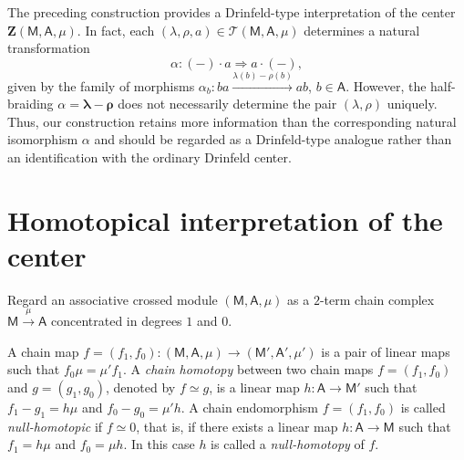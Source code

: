 \documentclass[12pt,reqno]{amsart}
\theoremstyle{plain}
\theoremstyle{definition}
\theoremstyle{remark}
\newcommand{\A}{\ensuremath{\mathsf{A}}}
\newcommand{\MM}{\ensuremath{\mathsf{M}}}
\newcommand{\ZC}{\ensuremath{\mathbf{Z}}}
\newcommand{\T}{\ensuremath{\mathcal{T}}}
\numberwithin{equation}{section}
\begin{document}
The preceding construction provides a Drinfeld-type interpretation of the center $\ZC(\MM,\A,\mu)$. In fact, each $(\lambda,\rho,a)\in\T(\MM,\A,\mu)$ determines a natural transformation 
\[\alpha\colon (-)\cdot a \Longrightarrow a\cdot (-),\]
given by the family of morphisms $\alpha_{b}\colon ba\xrightarrow{\lambda(b)-\rho(b)}ab$, $b\in \A$. However, the half-braiding $\alpha=\boldsymbol{\lambda}-\boldsymbol{\rho}$ does not necessarily determine the pair $(\lambda,\rho)$ uniquely. Thus, our construction retains more information than the corresponding natural isomorphism $\alpha$ and should be regarded as a Drinfeld-type analogue rather than an identification with the ordinary Drinfeld center.


\section{Homotopical interpretation of the center} \label{S:homoto}


Regard an associative crossed module $(\MM,\A,\mu)$ as a $2$-term chain complex $\MM\xrightarrow{\mu}\A$
concentrated in degrees $1$ and $0$.

A chain map  $f=(f_1,f_0)\colon  (\MM,\A,\mu) \to  (\MM',\A',\mu')$  is a pair of linear maps such that $f_0\mu=\mu' f_1$. A \emph{chain homotopy}  between two chain maps $f=(f_1,f_0)$ and  $g=(g_1,g_0)$,
denoted by $f \simeq g$, is a
linear map $h \colon \A \to \MM'$ such that $f_1 - g_1= h \mu$ and   $f_0 - g_0=  \mu' h$. 
A chain endomorphism   $f=(f_1,f_0)$ is called  \emph{null-homotopic} if $f \simeq 0$, that is,  if there exists a linear map $h \colon \A \to \MM$ such that  $f_1 = h \mu$ and   $f_0=  \mu h$. In this  case $h$ is called a  \emph{null-homotopy} of $f$.
\end{document}
